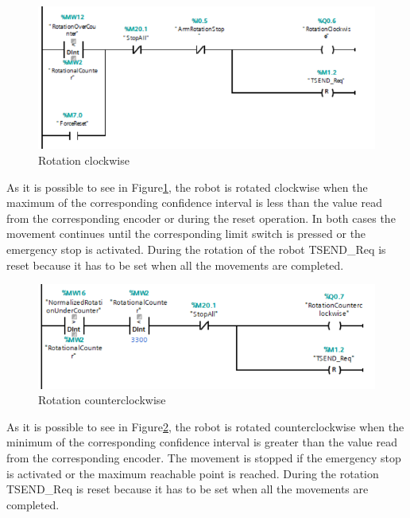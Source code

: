 \begin{figure}[!h]
\begin{center}
\includegraphics[width=0.6\linewidth]{capitolo3/figure/Segmento1_7_RC.PNG}
\caption{Rotation clockwise}
\label{fig:rotation_clockwise}
\end{center}
\end{figure}

As it is possible  to see in Figure\ref{fig:rotation_clockwise}, the robot is rotated clockwise when the maximum of the corresponding confidence interval is less than the value read from the corresponding encoder or during the reset operation. In both cases  the movement continues until the corresponding limit switch is pressed or the emergency stop is activated. During the rotation of the robot TSEND\_Req is reset because it has to be set when all the movements are completed.


\begin{figure}[!h]
\begin{center}
\includegraphics[width=0.6\linewidth]{capitolo3/figure/Segmento1_8_RCC.PNG}
\caption{Rotation counterclockwise}
\label{fig:rotation_counterclockwise}
\end{center}
\end{figure}

As it is possible  to see in Figure\ref{fig:rotation_counterclockwise}, the robot is rotated counterclockwise when the minimum of the corresponding confidence interval is greater than the value read from the corresponding encoder. The movement is stopped if the emergency stop is activated or the maximum reachable point is reached. During the rotation TSEND\_Req is reset because it has to be set when all the movements are completed.

